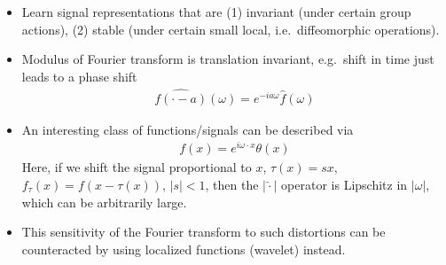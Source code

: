 \documentclass{article}
\begin{document}
\begin{itemize}
\item Learn signal representations that are (1) invariant (under certain group actions), (2) stable (under certain small local, i.e.~diffeomorphic operations).
\item Modulus of Fourier transform is translation invariant, e.g.~shift in time just leads to a phase shift 
\begin{align}
\widehat{ f(\cdot -a)}(\omega) = e^{-i a\omega} \hat f(\omega)
\end{align}
\item An interesting class of functions/signals  can be described via 
\begin{align}
f(x) = e^{i \omega \cdot x} \theta(x)
\end{align}
Here, if we shift the signal proportional to $x$, $\tau(x) = sx$, $f_\tau(x) = f(x-\tau(x))$, $|s|<1$, then the $|\hat{\cdot}|$ operator is Lipschitz in $| \omega|$, which can be arbitrarily large. 
\item This sensitivity of the Fourier transform to such distortions can be counteracted by using localized functions (wavelet) instead. 
\end{itemize}
\end{document}
